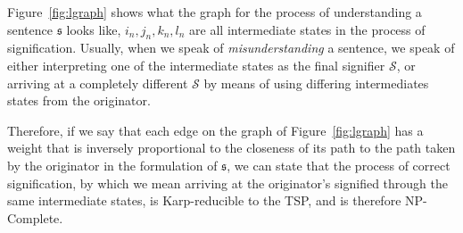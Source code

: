 \documentclass[11pt,letterpaper]{article}
\theoremstyle{definition}
\begin{document}
\begin{minipage}{\linewidth}
    \label{fig:lgraph}
\end{minipage}
\newpage
Figure~\ref{fig:lgraph} shows what the graph for the process of understanding a sentence \(\mathfrak{s}\) looks like, \(i_n, j_n, k_n, l_n\) are all intermediate states in the process of signification. Usually, when we speak of \emph{misunderstanding} a sentence, we speak of either interpreting one of the intermediate states as the final signifier \(\mathscr{S}\), or arriving at a completely different \(\mathscr{S}\) by means of using differing intermediates states from the originator.

Therefore, if we say that each edge on the graph of Figure~\ref{fig:lgraph} has a weight that is inversely proportional to the closeness of its path to the path taken by the originator in the formulation of \(\mathfrak{s}\), we can state that the process of correct signification, by which we mean arriving at the originator's signified through the same intermediate states, is Karp-reducible to the TSP, and is therefore NP-Complete.
\end{document}
